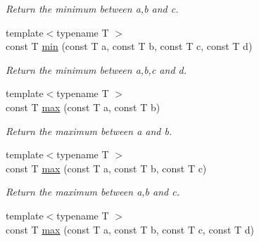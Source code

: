 \begin{DoxyCompactItemize}
\begin{DoxyCompactList}\small\item\em Return the minimum between {\ttfamily a},{\ttfamily b} and {\itshape c\/}. \item\end{DoxyCompactList}\item 
\hypertarget{namespacecimg__library_1_1cimg_a7f16d9918bd054766b35dd29ef5f9e5d}{
{\footnotesize template$<$typename T $>$ }\\const T \hyperlink{namespacecimg__library_1_1cimg_a7f16d9918bd054766b35dd29ef5f9e5d}{min} (const T a, const T b, const T c, const T d)}
\label{namespacecimg__library_1_1cimg_a7f16d9918bd054766b35dd29ef5f9e5d}

\begin{DoxyCompactList}\small\item\em Return the minimum between {\ttfamily a},{\ttfamily b},{\ttfamily c} and {\ttfamily d}. \item\end{DoxyCompactList}\item 
\hypertarget{namespacecimg__library_1_1cimg_afc89cd6246eae867b8dd8219d1db9242}{
{\footnotesize template$<$typename T $>$ }\\const T \hyperlink{namespacecimg__library_1_1cimg_afc89cd6246eae867b8dd8219d1db9242}{max} (const T a, const T b)}
\label{namespacecimg__library_1_1cimg_afc89cd6246eae867b8dd8219d1db9242}

\begin{DoxyCompactList}\small\item\em Return the maximum between {\ttfamily a} and {\ttfamily b}. \item\end{DoxyCompactList}\item 
\hypertarget{namespacecimg__library_1_1cimg_adafdabfabf6275f7d655eae73d47d057}{
{\footnotesize template$<$typename T $>$ }\\const T \hyperlink{namespacecimg__library_1_1cimg_adafdabfabf6275f7d655eae73d47d057}{max} (const T a, const T b, const T c)}
\label{namespacecimg__library_1_1cimg_adafdabfabf6275f7d655eae73d47d057}

\begin{DoxyCompactList}\small\item\em Return the maximum between {\ttfamily a},{\ttfamily b} and {\ttfamily c}. \item\end{DoxyCompactList}\item 
\hypertarget{namespacecimg__library_1_1cimg_a607cf23cd7144a41788b5e39a7996c83}{
{\footnotesize template$<$typename T $>$ }\\const T \hyperlink{namespacecimg__library_1_1cimg_a607cf23cd7144a41788b5e39a7996c83}{max} (const T a, const T b, const T c, const T d)}
\label{namespacecimg__library_1_1cimg_a607cf23cd7144a41788b5e39a7996c83}


\end{DoxyCompactItemize}
